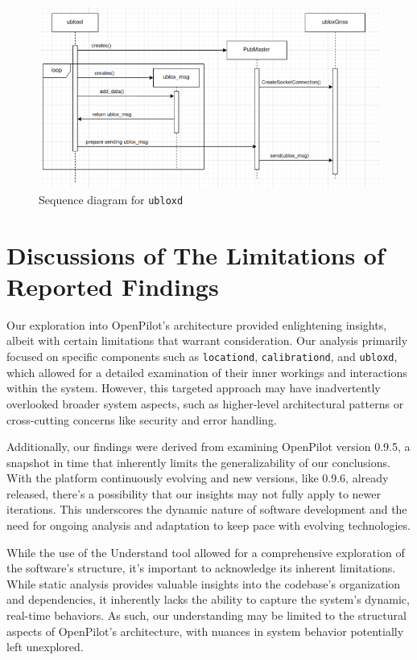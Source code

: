 \documentclass[12pt]{article}
\begin{document}
\begin{figure}[H]
    \centering
    \includegraphics[scale=0.5]{UbloxSequence.png}
    \caption{Sequence diagram for \texttt{ubloxd}}
    \label{fig:enter-label}
\end{figure}

\section{Discussions of The Limitations of Reported Findings}
Our exploration into OpenPilot's architecture provided enlightening insights, albeit with certain limitations that warrant consideration. Our analysis primarily focused on specific components such as \texttt{locationd}, \texttt{calibrationd}, and \texttt{ubloxd}, which allowed for a detailed examination of their inner workings and interactions within the system. However, this targeted approach may have inadvertently overlooked broader system aspects, such as higher-level architectural patterns or cross-cutting concerns like security and error handling.

Additionally, our findings were derived from examining OpenPilot version 0.9.5, a snapshot in time that inherently limits the generalizability of our conclusions. With the platform continuously evolving and new versions, like 0.9.6, already released, there's a possibility that our insights may not fully apply to newer iterations. This underscores the dynamic nature of software development and the need for ongoing analysis and adaptation to keep pace with evolving technologies.

While the use of the Understand tool allowed for a comprehensive exploration of the software's structure, it's important to acknowledge its inherent limitations. While static analysis provides valuable insights into the codebase's organization and dependencies, it inherently lacks the ability to capture the system's dynamic, real-time behaviors. As such, our understanding may be limited to the structural aspects of OpenPilot's architecture, with nuances in system behavior potentially left unexplored.
\end{document}
